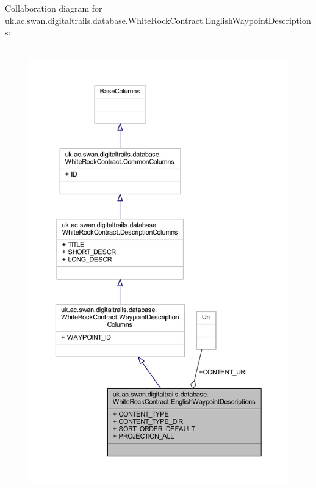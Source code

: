 Collaboration diagram for uk.\+ac.\+swan.\+digitaltrails.\+database.\+White\+Rock\+Contract.\+English\+Waypoint\+Descriptions\+:
\nopagebreak
\begin{figure}[H]
\begin{center}
\leavevmode
\includegraphics[height=550pt]{classuk_1_1ac_1_1swan_1_1digitaltrails_1_1database_1_1_white_rock_contract_1_1_english_waypoint_descriptions__coll__graph}
\end{center}
\end{figure}
